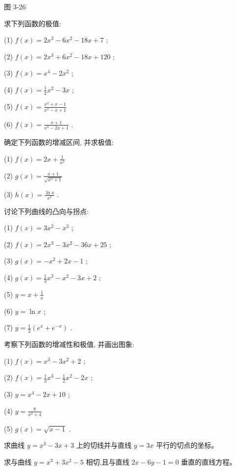 \documentclass[lang=cn,newtx,10pt,scheme=chinese]{elegantbook}
\begin{document}
图 3-26

\begin{problemset}[习 题 十 二]

\item 求下列函数的极值:

(1) \(f\left( x\right) = 2{x}^{3} - 6{x}^{2} - {18x} + 7\) ;

(2) \(f\left( x\right) = 2{x}^{3} + 6{x}^{2} - {18x} + {120}\) ;

(3) \(f\left( x\right) = {x}^{4} - 2{x}^{2}\) ;

(4) \(f\left( x\right) = \frac{1}{2}{x}^{2} - {3x}\) ;

(5) \(f\left( x\right) = \frac{{x}^{2} + x - 1}{{x}^{2} - x + 1}\)

(6) \(f\left( x\right) = \frac{x + 1}{{x}^{2} - {2x} + 1}\) .

\item 确定下列函数的增减区间, 并求极值:

(1) \(f\left( x\right) = {2x} + \frac{1}{{x}^{2}}\)

(2) \(g\left( x\right) = \frac{x + 1}{\sqrt{{x}^{2} + 1}}\)

(3) \(h\left( x\right) = \frac{\ln x}{{x}^{2}}\) .

\item 讨论下列曲线的凸向与拐点:

(1) \(f\left( x\right) = 3{x}^{2} - {x}^{3}\) ;

(2) \(f\left( x\right) = 2{x}^{3} - 3{x}^{2} - {36x} + {25}\) ;

(3) \(g\left( x\right) = - {x}^{2} + {2x} - 1\) ;

(4) \(g\left( x\right) = \frac{1}{3}{x}^{3} - {x}^{2} - {3x} + 2\) ;

(5) \(y = x + \frac{1}{x}\)

(6) \(y = \ln x\) ;

(7) \(y = \frac{1}{2}\left( {{e}^{x} + {e}^{-x}}\right)\) .

\item 考察下列函数的增减性和极值, 并画出图象:

(1) \(f\left( x\right) = {x}^{3} - 3{x}^{2} + 2\) ;

(2) \(f\left( x\right) = \frac{1}{3}{x}^{3} - \frac{1}{2}{x}^{2} - {2x}\) ;

(3) \(y = {x}^{4} - {2x} + {10}\) ;

(4) \(y = \frac{8}{{x}^{2} + 4}\)

(5) \(g\left( x\right) = \sqrt{x - 1}\) .

\item 求曲线 \(y = {x}^{3} - {3x} + 3\) 上的切线并与直线 \(y = {3x}\) 平行的切点的坐标。

\item 求与曲线 \(y = {x}^{3} + 3{x}^{2} - 5\) 相切,且与直线 \({2x} - {6y} - 1 = 0\) 垂直的直线方程。

\end{problemset}
\end{document}
